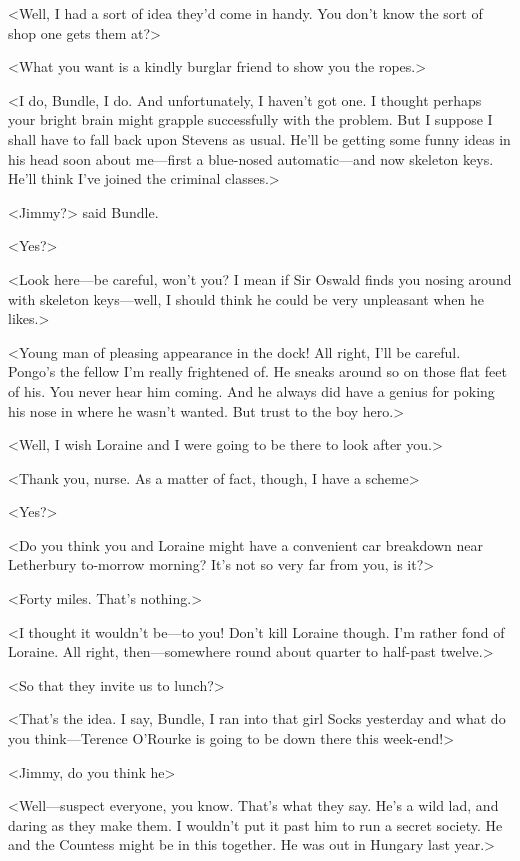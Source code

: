 <Well, I had a sort of idea they'd come in handy. You don't know the sort of shop one gets them at?>

<What you want is a kindly burglar friend to show you the ropes.>

<I do, Bundle, I do. And unfortunately, I haven't got one. I thought perhaps your bright brain might grapple successfully with the problem. But I suppose I shall have to fall back upon Stevens as usual. He'll be getting some funny ideas in his head soon about me—first a blue-nosed automatic—and now skeleton keys. He'll think I've joined the criminal classes.>

<Jimmy?> said Bundle.

<Yes?>

<Look here—be careful, won't you? I mean if Sir Oswald finds you nosing around with skeleton keys—well, I should think he could be very unpleasant when he likes.>

<Young man of pleasing appearance in the dock! All right, I'll be careful. Pongo's the fellow I'm really frightened of. He sneaks around so on those flat feet of his. You never hear him coming. And he always did have a genius for poking his nose in where he wasn't wanted. But trust to the boy hero.>

<Well, I wish Loraine and I were going to be there to look after you.>

<Thank you, nurse. As a matter of fact, though, I have a scheme\longdash>

<Yes?>

<Do you think you and Loraine might have a convenient car breakdown near Letherbury to-morrow morning? It's not so very far from you, is it?>

<Forty miles. That's nothing.>

<I thought it wouldn't be—to you! Don't kill Loraine though. I'm rather fond of Loraine. All right, then—somewhere round about quarter to half-past twelve.>

<So that they invite us to lunch?>

<That's the idea. I say, Bundle, I ran into that girl Socks yesterday and what do you think—Terence O'Rourke is going to be down there this week-end!>

<Jimmy, do you think he\longdash>

<Well—suspect everyone, you know. That's what they say. He's a wild lad, and daring as they make them. I wouldn't put it past him to run a secret society. He and the Countess might be in this together. He was out in Hungary last year.>

